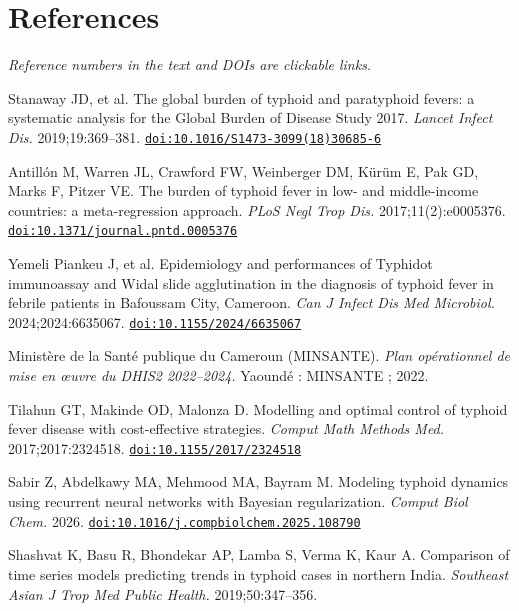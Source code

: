 \documentclass[11pt]{article}
\begin{document}
\section*{References}
\footnotesize
\noindent\textit{Reference numbers in the text and DOIs are clickable links.}
\begin{enumerate}[label={[\arabic*]},leftmargin=2.2em,itemsep=0.5pt]
\item\hypertarget{ref1}{}Stanaway JD, et al. The global burden of typhoid and paratyphoid fevers: a systematic analysis for the Global Burden of Disease Study 2017. \textit{Lancet Infect Dis.} 2019;19:369--381. \href{https://doi.org/10.1016/S1473-3099(18)30685-6}{\nolinkurl{doi:10.1016/S1473-3099(18)30685-6}}
\item\hypertarget{ref2}{}Antillón M, Warren JL, Crawford FW, Weinberger DM, Kürüm E, Pak GD, Marks F, Pitzer VE. The burden of typhoid fever in low- and middle-income countries: a meta-regression approach. \textit{PLoS Negl Trop Dis.} 2017;11(2):e0005376. \href{https://doi.org/10.1371/journal.pntd.0005376}{\nolinkurl{doi:10.1371/journal.pntd.0005376}}
\item\hypertarget{ref3}{}Yemeli Piankeu J, et al. Epidemiology and performances of Typhidot immunoassay and Widal slide agglutination in the diagnosis of typhoid fever in febrile patients in Bafoussam City, Cameroon. \textit{Can J Infect Dis Med Microbiol.} 2024;2024:6635067. \href{https://doi.org/10.1155/2024/6635067}{\nolinkurl{doi:10.1155/2024/6635067}}
\item\hypertarget{ref4}{}Ministère de la Santé publique du Cameroun (MINSANTE). \textit{Plan opérationnel de mise en œuvre du DHIS2 2022--2024.} Yaoundé : MINSANTE ; 2022.
\item\hypertarget{ref5}{}Tilahun GT, Makinde OD, Malonza D. Modelling and optimal control of typhoid fever disease with cost-effective strategies. \textit{Comput Math Methods Med.} 2017;2017:2324518. \href{https://doi.org/10.1155/2017/2324518}{\nolinkurl{doi:10.1155/2017/2324518}}
\item\hypertarget{ref6}{}Sabir Z, Abdelkawy MA, Mehmood MA, Bayram M. Modeling typhoid dynamics using recurrent neural networks with Bayesian regularization. \textit{Comput Biol Chem.} 2026. \href{https://doi.org/10.1016/j.compbiolchem.2025.108790}{\nolinkurl{doi:10.1016/j.compbiolchem.2025.108790}}
\item\hypertarget{ref7}{}Shashvat K, Basu R, Bhondekar AP, Lamba S, Verma K, Kaur A. Comparison of time series models predicting trends in typhoid cases in northern India. \textit{Southeast Asian J Trop Med Public Health.} 2019;50:347--356.

\end{enumerate}
\end{document}
